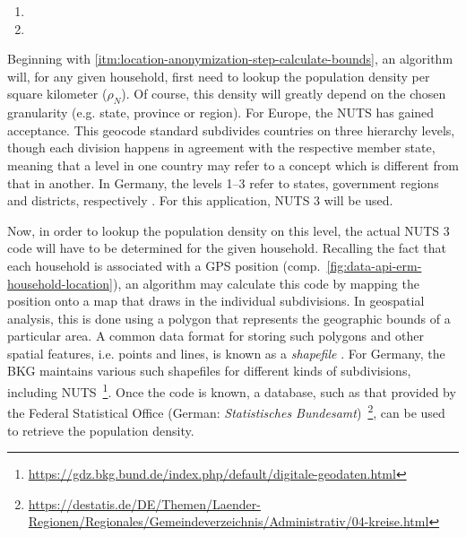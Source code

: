 \begin{enumerate}[label=(\Alph*)]
  \item {}
  \item {}
\end{enumerate}

Beginning with \ref{itm:location-anonymization-step-calculate-bounds}, an algorithm will, for any given household, first need to lookup the population density per square kilometer ($\rho_N$). Of course, this density will greatly depend on the chosen granularity (e.g. state, province or region). For Europe, the \ac{NUTS} has gained acceptance. This geocode standard subdivides countries on three hierarchy levels, though each division happens in agreement with the respective member state, meaning that a level in one country may refer to a concept which is different from that in another. In Germany, the levels 1--3 refer to states, government regions and districts, respectively \cite[p.~6]{eurostat2020nuts}. For this application, \ac{NUTS} 3 will be used.

Now, in order to lookup the population density on this level, the actual \acs{NUTS} 3 code will have to be determined for the given household. Recalling the fact that each household is associated with a \ac{GPS} position (comp.~\autoref{fig:data-api-erm-household-location}), an algorithm may calculate this code by mapping the position onto a map that draws in the individual subdivisions. In geospatial analysis, this is done using a polygon that represents the geographic bounds of a particular area. A common data format for storing such polygons and other spatial features, i.e. points and lines, is known as a \textit{shapefile} \cite{de2007geospatial}. For Germany, the \acl*{BKG} maintains various such shapefiles for different kinds of subdivisions, including \acs{NUTS}~\footnote{\url{https://gdz.bkg.bund.de/index.php/default/digitale-geodaten.html}}. Once the code is known, a database, such as that provided by the Federal Statistical Office (German: \textit{Statistisches Bundesamt})~\footnote{\url{https://destatis.de/DE/Themen/Laender-Regionen/Regionales/Gemeindeverzeichnis/Administrativ/04-kreise.html}}, can be used to retrieve the population density.


